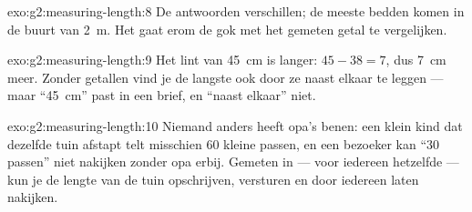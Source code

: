 \begin{solution}{exo:g2:measuring-length:8}
De antwoorden verschillen; de meeste bedden komen in de buurt van
\qty{2}{m}. Het gaat erom de gok met het gemeten getal te
vergelijken.
\end{solution}

\begin{solution}{exo:g2:measuring-length:9}
Het lint van \qty{45}{cm} is langer: $45 - 38 = 7$, dus \qty{7}{cm}
meer. Zonder getallen vind je de langste ook door ze naast elkaar te
leggen --- maar ``\qty{45}{cm}'' past in een brief, en ``naast
elkaar'' niet.
\end{solution}

\begin{solution}{exo:g2:measuring-length:10}
Niemand anders heeft opa's benen: een klein kind dat dezelfde tuin
afstapt telt misschien $60$ kleine passen, en een bezoeker kan
``$30$ passen'' niet nakijken zonder opa erbij. Gemeten in
 --- voor iedereen hetzelfde --- kun je de lengte van de tuin
opschrijven, versturen en door iedereen laten nakijken.
\end{solution}
